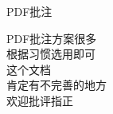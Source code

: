 \documentclass[fontset = none, t, aspectratio=169]{ctexbeamer}
\begin{document}
\begin{frame}[c]{PDF批注}
  \begin{center}
    \begin{spacing}{1.8}
      PDF批注方案很多\\
      根据习惯选用即可\\
      这个文档\\
      肯定有不完善的地方\\
      欢迎批评指正\\
    \end{spacing}
  \end{center}
\end{frame}


\end{document}
